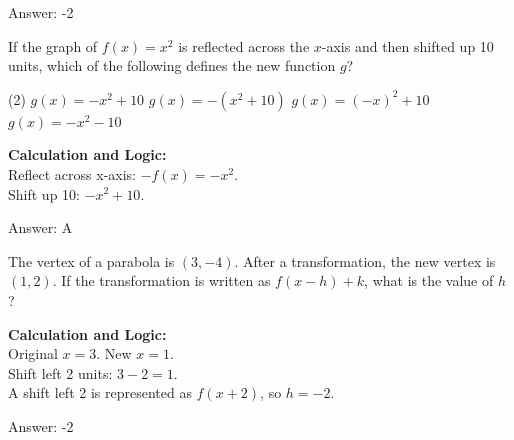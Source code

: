 \documentclass[11pt,paper=a4,answers]{exam}
\begin{document}
\begin{questions}
\begin{solution}
\vspace{25pt}

Answer: \colorbox{yellow!100}{-2}
\end{solution}

\vspace{40pt}

\question

If the graph of $f(x) = x^2$ is reflected across the $x$-axis and then shifted up 10 units, which of the following defines the new function $g$?
\begin{tasks}(2)
    \task $g(x) = -x^2 + 10$
    \task $g(x) = -(x^2 + 10)$
    \task $g(x) = (-x)^2 + 10$
    \task $g(x) = -x^2 - 10$
\end{tasks}

\begin{solution}
\textbf{Calculation and Logic:} \\
Reflect across x-axis: $-f(x) = -x^2$. \\
Shift up 10: $-x^2 + 10$.

\vspace{25pt}

Answer: \colorbox{yellow!100}{A}
\end{solution}

\vspace{40pt}

\question
The vertex of a parabola is $(3, -4)$. After a transformation, the new vertex is $(1, 2)$. If the transformation is written as $f(x-h)+k$, what is the value of $h$?

\begin{solution}
\textbf{Calculation and Logic:} \\
Original $x = 3$. New $x = 1$. \\
Shift left 2 units: $3 - 2 = 1$. \\
A shift left 2 is represented as $f(x+2)$, so $h = -2$.

\vspace{25pt}

Answer: \colorbox{yellow!100}{-2}
\end{solution}

\vspace{40pt}


\end{questions}
\end{document}
